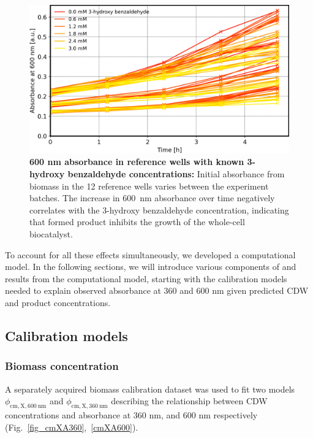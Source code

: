 \documentclass[sn-standardnature]{sn-jnl}%
\theoremstyle{thmstyleone}%
\theoremstyle{thmstyletwo}%
\theoremstyle{thmstylethree}%
\begin{document}
\begin{figure}[h]
    \centering
    \includegraphics[width=1.0\textwidth]{figures/plot_A600_kinetics.png}
    \caption{
        \textbf{600 nm absorbance in reference wells with known 3-hydroxy benzaldehyde concentrations:}
        Initial absorbance from biomass in the 12 reference wells varies between the experiment batches.
        The increase in 600~nm absorbance over time negatively correlates with the 3-hydroxy benzaldehyde concentration, indicating that formed product inhibits the growth of the whole-cell biocatalyst.
    }
    \label{fig_a600kinetics}
\end{figure}

To account for all these effects simultaneously, we developed a computational model.
In the following sections, we will introduce various components of and results from the computational model, starting with the calibration models needed to explain observed absorbance at 360 and 600 nm given predicted CDW and product concentrations.

\subsection{Calibration models}
\label{sec_calibrations}

\subsubsection{Biomass concentration}

A separately acquired biomass calibration dataset was used to fit two models $\phi_\mathrm{cm,X,600\ nm}$ and $\phi_\mathrm{cm,X,360\ nm}$ describing the relationship between CDW concentrations and absorbance at 360 nm, and 600 nm respectively (Fig.~\ref{fig_cmXA360},~\ref{cmXA600}).
\end{document}
